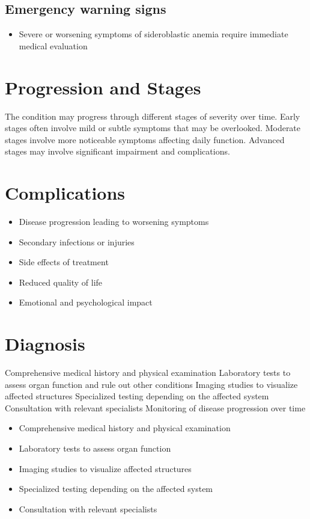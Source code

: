 \subsection{Emergency warning signs}
\begin{itemize}[noitemsep]
  \item Severe or worsening symptoms of sideroblastic anemia require immediate medical evaluation
\end{itemize}
\section{Progression and Stages}
The condition may progress through different stages of severity over time. Early stages often involve mild or subtle symptoms that may be overlooked. Moderate stages involve more noticeable symptoms affecting daily function. Advanced stages may involve significant impairment and complications.
\section{Complications}
\begin{itemize}[noitemsep]
  \item Disease progression leading to worsening symptoms
  \item Secondary infections or injuries
  \item Side effects of treatment
  \item Reduced quality of life
  \item Emotional and psychological impact
\end{itemize}
\section{Diagnosis}
Comprehensive medical history and physical examination Laboratory tests to assess organ function and rule out other conditions Imaging studies to visualize affected structures Specialized testing depending on the affected system Consultation with relevant specialists Monitoring of disease progression over time

\begin{itemize}[noitemsep]
  \item Comprehensive medical history and physical examination
  \item Laboratory tests to assess organ function
  \item Imaging studies to visualize affected structures
  \item Specialized testing depending on the affected system
  \item Consultation with relevant specialists
\end{itemize}
